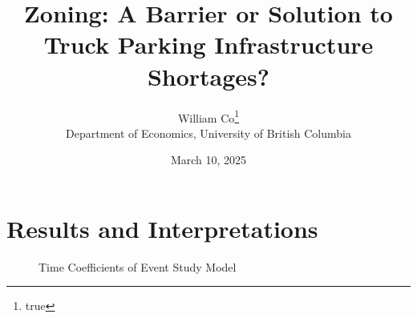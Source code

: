 \documentclass[
  8pt,
  12pt]{article}
\begin{document}
\def\spacingset#1{\renewcommand{\baselinestretch}%
{#1}\small\normalsize} \spacingset{1}



\date{March 10, 2025}
\title{\bf Zoning: A Barrier or Solution to Truck Parking Infrastructure
Shortages?}
\author{
William Co\thanks{true}\\
Department of Economics, University of British Columbia\\
}
\maketitle

\bigskip
\bigskip
\begin{abstract}

\end{abstract}


\newpage
\spacingset{1.9} %

\section{Results and Interpretations}\label{results-and-interpretations}

\begin{figure}


\caption{\label{fig-time}Time Coefficients of Event Study Model}

\end{figure}%
\end{document}
